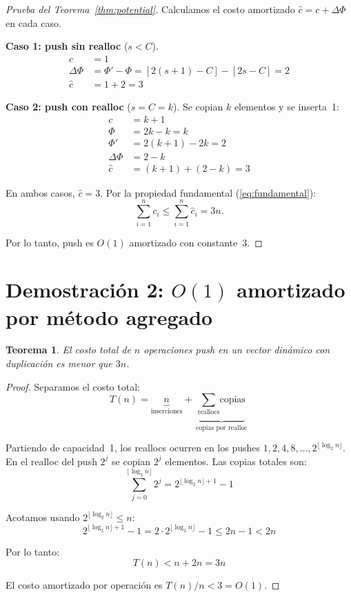 \documentclass[11pt, letterpaper]{article}
\theoremstyle{definition}
\theoremstyle{plain}
\newtheorem{theorem}{Teorema}[section]
\theoremstyle{remark}
\begin{document}
\begin{proof}[Prueba del Teorema~\ref{thm:potential}]
Calculamos el costo amortizado $\hat{c} = c + \Delta\Phi$ en cada caso.

\textbf{Caso 1: push sin realloc} ($s < C$).
\begin{align*}
  c        &= 1 \\
  \Delta\Phi &= \Phi' - \Phi = [2(s+1) - C] - [2s - C] = 2 \\
  \hat{c}  &= 1 + 2 = 3
\end{align*}

\textbf{Caso 2: push con realloc} ($s = C = k$).
Se copian $k$ elementos y se inserta~1:
\begin{align*}
  c          &= k + 1 \\
  \Phi       &= 2k - k = k \\
  \Phi'      &= 2(k+1) - 2k = 2 \\
  \Delta\Phi &= 2 - k \\
  \hat{c}    &= (k+1) + (2-k) = 3
\end{align*}

En ambos casos, $\hat{c} = 3$. Por la propiedad fundamental
(\ref{eq:fundamental}):
\[
  \sum_{i=1}^{n} c_i \leq \sum_{i=1}^{n} \hat{c}_i = 3n.
\]

Por lo tanto, push es $O(1)$ amortizado con constante~3.
\end{proof}

\section{Demostración 2: \texorpdfstring{$O(1)$}{O(1)} amortizado
  por método agregado}

\begin{theorem}\label{thm:aggregate}
El costo total de $n$ operaciones push en un vector dinámico con
duplicación es menor que $3n$.
\end{theorem}

\begin{proof}
Separamos el costo total:
\[
  T(n) = \underbrace{n}_{\text{inserciones}}
       + \underbrace{\sum_{\text{reallocs}} \text{copias}}_{\text{copias por realloc}}
\]

Partiendo de capacidad~1, los reallocs ocurren en los pushes
$1, 2, 4, 8, \ldots, 2^{\lfloor \log_2 n \rfloor}$. En el realloc del
push $2^j$ se copian $2^j$ elementos. Las copias totales son:
\[
  \sum_{j=0}^{\lfloor \log_2 n \rfloor} 2^j
  = 2^{\lfloor \log_2 n \rfloor + 1} - 1
\]

Acotamos usando $2^{\lfloor \log_2 n \rfloor} \leq n$:
\[
  2^{\lfloor \log_2 n \rfloor + 1} - 1
  = 2 \cdot 2^{\lfloor \log_2 n \rfloor} - 1
  \leq 2n - 1
  < 2n
\]

Por lo tanto:
\[
  T(n) < n + 2n = 3n
\]

El costo amortizado por operación es $T(n)/n < 3 = O(1)$.
\end{proof}
\end{document}
